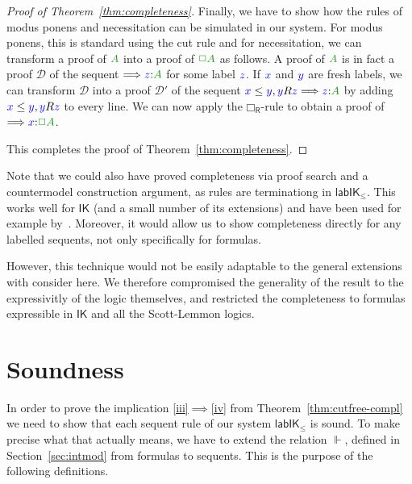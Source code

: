 \documentclass[a4paper]{article}
\theoremstyle{plain}
\theoremstyle{definition}
\newcommand*{\IK}{\mathsf{IK}}
\newcommand*{\labIKp}{\lab\IK_{\le}}
\newcommand*{\BOX}{\mathord{\Box}}
\newcommand*{\fm}[1]{{\color{notgreen}{#1}}}
\newcommand*{\lb}[1]{{\color{blue}{#1}}}
\newcommand*{\labels}[2]{\lb{#1}\mathord{:}\fm{#2}}
\newcommand*{\accs}[2]{\lb{#1}R\lb{#2}}
\newcommand*{\futs}[2]{\lb{#1}\le{\lb{#2}}}
\newcommand{\SEQ}{\Longrightarrow}
\newcommand*{\rn}[1]  {\ensuremath{\mathsf{#1}}}
\newcommand*{\lab}{\mathsf{lab}}
\newcommand*{\rlabrn}[2][]  {\rn{#2}_\rn{R#1}}%
\newcommand*{\DD}{\mathcal{D}}
\begin{document}
\begin{proof}[Proof of Theorem~\ref{thm:completeness}]
	
	
	Finally, we have to show how the rules of modus ponens and
	necessitation can be simulated in our system. For modus ponens, this
	is standard using the cut rule and for necessitation, we can
	transform a proof of $\fm A$ into a proof of $\fm{\BOX A}$ as
	follows.
	A proof of $\fm A$ is in fact a proof $\DD$ of the sequent
	$\SEQ{\labels{z}{A}}$ for some label $\lb z$. If $\lb x$ and $\lb y$
	are fresh labels, we can transform $\DD$ into a proof $\DD'$ of the
	sequent $\futs xy, \accs yz \SEQ \labels{z}{A}$ by adding $\futs xy,
	\accs yz$ to every line. We can now apply the $\rlabrn\BOX$-rule to
	obtain a proof of $\SEQ \labels{x}{\BOX A}$.
	
	This completes the proof of Theorem~\ref{thm:completeness}.
\end{proof}


Note that we could also have proved completeness via proof search and a countermodel construction argument, as rules are terminationg in $\labIKp$. 
%
This works well for $\IK$ (and a small number of its extensions) and have been used for example by~\cite{maffezioli:etal:synthese13}. 
%
Moreover, it would allow us to show completeness directly for any labelled sequents, not only specifically for formulas. 

However, this technique would not be easily adaptable to the general extensions with consider here. 
%
We therefore compromised the generality of the result to the expressivitly of the logic themselves, and restricted the completeness to formulas expressible in $\IK$ and all the Scott-Lemmon logics.

\section{Soundness}\label{sec:soundness}

In order to prove the implication \ref{iii}$\implies$\ref{iv} from
Theorem~\ref{thm:cutfree-compl} we need to show that each sequent rule
of our system $\labIKp$ is sound. To make precise what that actually
means, we have to extend the relation $\Vdash$, defined in
Section~\ref{sec:intmod} from formulas to sequents. This is the
purpose of the following definitions.
\end{document}

